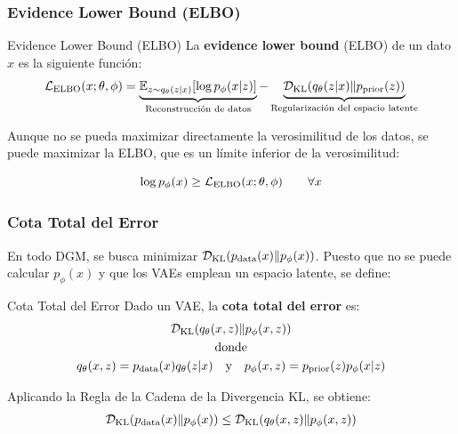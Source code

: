 \documentclass{beamer}
\begin{document}
\begin{frame}
    \frametitle{Evidence Lower Bound (ELBO)}

    \begin{definitionblock}{Evidence Lower Bound (ELBO)}
        La \textbf{evidence lower bound} (ELBO) de un dato $x$ es la siguiente función:
        \begin{equation*}
            \mathcal{L}_{\text{ELBO}}(x; \theta, \phi) = 
            \underbrace{\mathbb{E}_{z\sim q_\theta(z|x)}[\log p_\phi(x|z)]}_{\text{Reconstrucción de datos}} -
            \underbrace{\mathcal{D}_{\text{KL}}(q_\theta(z|x)\| p_{\text{prior}}(z))}_{\text{Regularización del espacio latente}}
        \end{equation*}
    \end{definitionblock}\pause
    Aunque no se pueda maximizar directamente la verosimilitud de los datos, se puede maximizar la ELBO, que es un límite inferior de la verosimilitud:
    \begin{theorem}
        \begin{equation*}
            \log p_\phi(x) \geq \mathcal{L}_{\text{ELBO}}(x; \theta, \phi)
            \qquad \forall x
        \end{equation*}
    \end{theorem}
\end{frame}

\begin{frame}
    \frametitle{Cota Total del Error}

    En todo DGM, se busca minimizar $\mathcal{D}_{\text{KL}}(p_{\text{data}}(x)\| p_\phi(x))$. Puesto que no se puede calcular $p_\phi(x)$ y que los VAEs emplean un espacio latente, se define:
    \begin{definitionblock}{Cota Total del Error}
        Dado un VAE, la \textbf{cota total del error} es:
        \begin{gather*}
            \mathcal{D}_{\text{KL}}(q_\theta(x, z)\| p_\phi(x, z))
            \\
            \text{donde}\\
            q_\theta(x, z) = p_{\text{data}}(x)q_\theta(z|x) \quad \text{y} \quad p_\phi(x, z) = p_{\text{prior}}(z)p_\phi(x|z)
        \end{gather*}
    \end{definitionblock}\pause

    Aplicando la Regla de la Cadena de la Divergencia KL, se obtiene:
    \begin{equation*}
        \mathcal{D}_{\text{KL}}(p_{\text{data}}(x)\| p_\phi(x)) \leq \mathcal{D}_{\text{KL}}(q_\theta(x, z)\| p_\phi(x, z))
    \end{equation*}
\end{frame}
\end{document}

